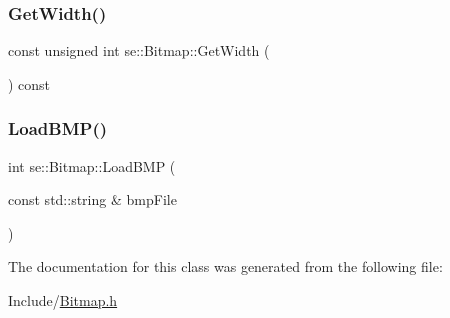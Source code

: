 \subsubsection{\texorpdfstring{Get\+Width()}{GetWidth()}}
{\footnotesize\ttfamily const unsigned int se\+::\+Bitmap\+::\+Get\+Width (\begin{DoxyParamCaption}{ }\end{DoxyParamCaption}) const}

\mbox{\label{classse_1_1_bitmap_a76c7fbaf5d2049af44abf83fe40a854d}} 
\subsubsection{\texorpdfstring{Load\+B\+M\+P()}{LoadBMP()}}
{\footnotesize\ttfamily int se\+::\+Bitmap\+::\+Load\+B\+MP (\begin{DoxyParamCaption}\item[{const std\+::string \&}]{bmp\+File }\end{DoxyParamCaption})}



The documentation for this class was generated from the following file\+:\begin{DoxyCompactItemize}
\item 
Include/\mbox{\hyperlink{_bitmap_8h}{Bitmap.\+h}}\end{DoxyCompactItemize}
